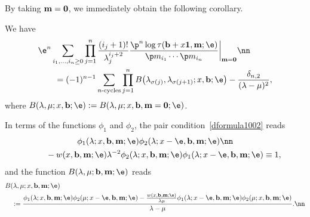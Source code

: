 By taking ${\bf m}={\bf 0}$, we immediately obtain the following corollary.
\begin{Corollary} We have
\begin{align}
& \e^n\sum_{i_1,\dots,i_n\ge0}
\prod_{j=1}^n \frac{(i_j+1)!}{\lambda_j^{i_j+2}} \frac{\p^n \log \tau({\bf b}+x{\bf 1},{\bf m};\e)}{\p m_{i_1} \cdots \p m_{i_n}}\bigg|_{{\bf m}={\bf 0}}
\nn\\
& \qquad{} = (-1)^{n-1}
\sum_{\text{$n$-cycles}}
\prod_{j=1}^n B\bigl(\lambda_{\sigma(j)},\lambda_{\sigma(j+1)}; x, {\bf b};\e\bigr) - \frac{\delta_{n,2}}{(\lambda-\mu)^2},\label{Y926-ext}
\end{align}
where $B(\lambda,\mu; x, {\bf b};\e):=B(\lambda,\mu; x, {\bf b},{\bf m}={\bf 0};\e)$.
\end{Corollary}

In terms of the functions $\phi_1$ and $\phi_2$, the pair condition~\eqref{dformula1002} reads
\begin{gather}
\phi_1(\lambda; x, {\bf b}, {\bf m};\e) \phi_2(\lambda; x-\e, {\bf b}, {\bf m};\e)\nn \\
\qquad{}- w(x, {\bf b}, {\bf m};\e)
\lambda^{-2} \phi_2(\lambda; x, {\bf b}, {\bf m};\e) \phi_1(\lambda; x-\e, {\bf b}, {\bf m};\e) \equiv 1,\label{pairconditionphi}
\end{gather}
and the function $B(\lambda,\mu;{\bf b},{\bf m};\e)$ reads
\begin{align}
&B(\lambda,\mu; x, {\bf b}, {\bf m};\e) \label{Bphiab} \\
&\quad{}:= \frac{\phi_1(\lambda; x, {\bf b}, {\bf m};\e) \phi_2(\mu; x-\e,{\bf b}, {\bf m};\e)
- \frac{w(x, {\bf b}, {\bf m};\e)}{\lambda\mu} \phi_1(\lambda; x-\e,{\bf b}, {\bf m};\e) \phi_2(\mu; x, {\bf b}, {\bf m};\e)}{\lambda-\mu}. \nn
\end{align}

